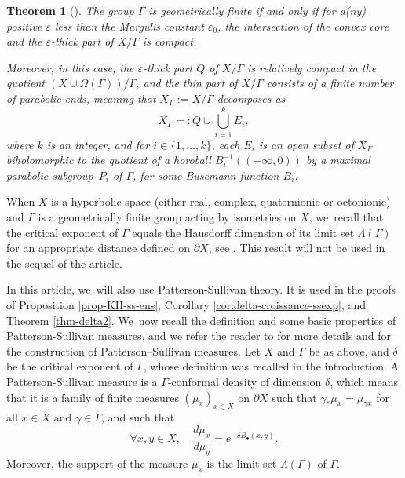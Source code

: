 \documentclass[11pt]{article}
\let\epsilon\varepsilon
\newtheorem*{theorem*}{Theorem}
\theoremstyle{definition}
\begin{document}
\begin{theorem*}[{\cite[Def.\,F1]{bowditchGeometricalFinitenessVariable1995}}]
The group $\Gamma$ is geometrically finite if and only if for a(ny) positive $\epsilon$ less than the Margulis constant $\epsilon_0$, the intersection of the convex core and the $\epsilon$-thick part of $X/\Gamma$ is compact.

Moreover, in this case, the $\epsilon$-thick part $Q$ of $X/\Gamma$ is relatively compact in the quotient $\left(X\cup \Omega(\Gamma)\right)/\Gamma$, and the thin part of $X/\Gamma$ consists of a finite number of parabolic ends, meaning that $X_{\Gamma}:=X/\Gamma$ decomposes as
\begin{equation}\label{eq-decompo-GF}
X_{\Gamma} =: Q \cup \bigcup_{i=1}^{k}E_i,
\end{equation}
where $k$ is an integer, and for $i\in \{1,\dots,k\}$, each $E_i$ is an open subset of $X_{\Gamma}$ biholomorphic to the quotient of a horoball $B_i^{-1}((-\infty,0))$ by a maximal parabolic subgroup~$P_i$ of $\Gamma$, for some Busemann function $B_i$.
\end{theorem*}
When $X$ is a hyperbolic space (either real, complex, quaternionic or octonionic) and $\Gamma$ is a geometrically finite group acting by isometries on $X$, we~recall that the critical exponent of $\Gamma$ equals the Hausdorff dimension of its limit set $\Lambda(\Gamma)$ for an appropriate distance defined on $\partial X$, see \cite[Th.\,6.1]{corletteLimitSetsDiscrete1999}. This result will not be used in the sequel of the article.

In this article, we~will also use Patterson-Sullivan theory. It is used in the proofs of Proposition \ref{prop-KH-ss-ens}, Corollary \ref{cor:delta-croissance-ssexp}, and Theorem \ref{thm-delta2}. We~now recall the definition and some basic properties of Patterson-Sullivan measures, and we refer the reader to \cite{roblinErgodiciteEquidistributionCourbure2003,pattersonLimitSetFuchsian1976, sullivanDensityInfinityDiscrete1979, nichollsErgodicTheoryDiscrete1989} for more details and for the construction of Patterson--Sullivan measures. Let $X$ and $\Gamma$ be as above, and $\delta$ be the critical exponent of $\Gamma$, whose definition was recalled in the introduction. A Patterson-Sullivan measure is a $\Gamma$\nobreakdash-conformal density of dimension $\delta$, which means that it is a family of finite measures $(\mu_x)_{x\in X}$ on $\partial X$ such that $\gamma_*\mu_x = \mu_{\gamma x}$ for all $x\in X$ and $\gamma\in \Gamma$, and such that
\begin{equation}\label{eq-prop-PS}
\forall x,y\in X,\quad \frac{d\mu_x}{d\mu_y}=e^{-\delta B_{\bullet}(x,y)}. \end{equation}
Moreover, the support of the measure $\mu_x$ is the limit set $\Lambda(\Gamma)$ of $\Gamma$.
\end{document}
